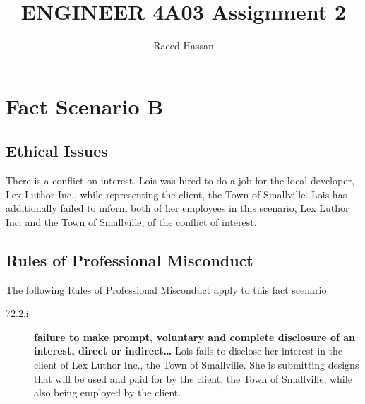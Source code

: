 \documentclass[12pt,letterpaper]{article}
\title{ENGINEER 4A03 Assignment 2}
\author{Raeed Hassan}
\begin{document}
\maketitle
\clearpage

\section*{Fact Scenario B}
\subsection*{Ethical Issues}
There is a conflict on interest. Lois was hired to do a job for the local developer, Lex Luthor Inc., while representing the client, the Town of Smallville. Lois has additionally failed to inform both of her employees in this scenario, Lex Luthor Inc. and the Town of Smallville, of the conflict of interest.

\subsection*{Rules of Professional Misconduct}
The following Rules of Professional Misconduct apply to this fact scenario:
\begin{description}
	\item[72.2.i] \textbf{failure to make prompt, voluntary and complete disclosure of an interest, direct or indirect\dots} Lois fails to disclose her interest in the client of Lex Luthor Inc., the Town of Smallville. She is submitting designs that will be used and paid for by the client, the Town of Smallville, while also being employed by the client.
\end{description}
\end{document}
